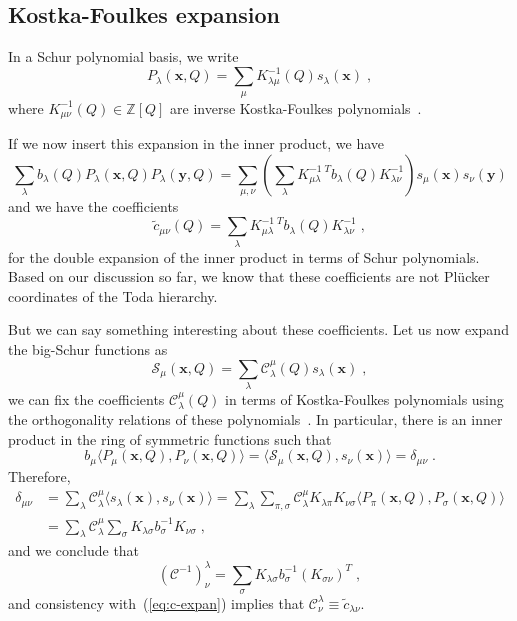 \documentclass[a4paper,11pt]{amsart}
\begin{document}
\subsection{Kostka-Foulkes expansion}
In a Schur polynomial basis, we write
\begin{equation}
P_\lambda(\bm{x}, Q) = \sum_{\mu} K^{-1}_{\lambda \mu}(Q) s_\lambda(\bm{x})\; , 
\end{equation}
where \(K^{-1}_{\mu\nu}(Q) \in \mathbb{Z}[Q]\) are inverse
Kostka-Foulkes polynomials~\cite{Macdonald:1998, Wheeler:2018}.

If we now insert this expansion in the inner product, we have 
\begin{equation}
    \sum_\lambda b_\lambda(Q) P_\lambda(\bm{x}, Q) P_\lambda(\bm{y}, Q) = 
    \sum_{\mu,\nu} \left(\sum_\lambda K_{\mu \lambda}^{-1 \; T} b_\lambda(Q)  K_{\lambda \nu}^{-1} \right)
    s_{\mu}(\bm{x}) s_{\nu}(\bm{y}) 
\end{equation}
and we have the coefficients 
\begin{equation}
\label{eq:c-expan}
 \tilde{c}_{\mu\nu}(Q) = \sum_\lambda K_{\mu \lambda}^{-1 \; T} b_\lambda(Q)  K_{\lambda \nu}^{-1} \; ,
\end{equation}
for the double expansion of the inner product in terms of Schur
polynomials. Based on our discussion so far, we know that these
coefficients are not Plücker coordinates of the Toda hierarchy.

But we can say something interesting about these coefficients. Let us
now expand the big-Schur functions as
\begin{equation}
\label{eq:kf-exp}
  \mathcal{S}_\mu(\bm{x}, Q) = \sum_{\lambda} \mathcal{C}^{\mu}_\lambda(Q) s_\lambda(\bm{x})\; ,
\end{equation}
we can fix the coefficients \(\mathcal{C}_\lambda^\mu(Q)\) in terms of
Kostka-Foulkes polynomials using the orthogonality relations of these
polynomials~\cite{Macdonald:1998}. In particular, there is an inner
product in the ring of symmetric functions such that
\begin{equation}
  b_\mu \langle P_\mu(\bm{x}, Q), P_\nu(\bm{x}, Q)\rangle = \langle
  \mathcal{S}_\mu(\bm{x}, Q), s_\nu(\bm{x})\rangle = \delta_{\mu\nu}\; .
\end{equation}
Therefore,
\begin{equation}
  \begin{split}
\delta_{\mu\nu} & = \sum_\lambda \mathcal{C}_\lambda^\mu \langle s_\lambda(\bm{x}), s_\nu(\bm{x})\rangle
 = \sum_\lambda \sum_{\pi, \sigma} \mathcal{C}_\lambda^\mu K_{\lambda \pi} K_{\nu \sigma}
\langle P_{\pi}(\bm{x}, Q), P_{\sigma}(\bm{x}, Q)\rangle \\ 
& = \sum_\lambda \mathcal{C}_\lambda^\mu \sum_{\sigma}K_{\lambda \sigma} b_{\sigma}^{-1} K_{\nu \sigma}\; ,
  \end{split}
\end{equation}
and we conclude that 
\begin{equation}
\label{eq:indices}
(\mathcal{C}^{-1})^\lambda_\nu = \sum_\sigma K_{\lambda\sigma} b^{-1}_\sigma (K_{\sigma\nu})^T\; ,
\end{equation}
and consistency with~(\ref{eq:c-expan}) implies that
\(\mathcal{C}^\lambda_\nu \equiv \tilde{c}_{\lambda\nu}\).
\end{document}
